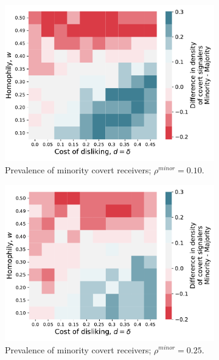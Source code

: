 \documentclass[11pt,letterpaper]{article}
\begin{document}
\begin{figure}[H]
  \centering
  \begin{subfigure}{0.4\textwidth}
    \centering
    \includegraphics[width=\textwidth]{Figures/covert_signalers_diff_010.pdf}
    \caption{Prevalence of minority covert receivers; $\rho^{minor} = 0.10$.}
  \end{subfigure}
  \hfill
  \begin{subfigure}{0.4\textwidth}
    \centering
    \includegraphics[width=\textwidth]{Figures/covert_signalers_diff_025.pdf}
    \caption{Prevalence of minority covert receivers; $\rho^{minor} = 0.25$.}
  \end{subfigure} \\[.25in]
  \begin{subfigure}{0.4\textwidth}

\end{subfigure}
\end{figure}
\end{document}
